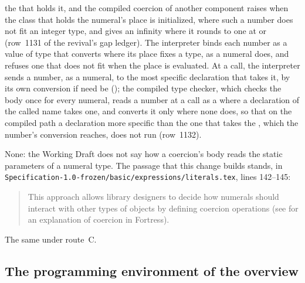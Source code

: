 \begin{description}
the  that holds it, and the compiled coercion of another
component raises  when the class that holds the numeral's
place is initialized, where such a number does not fit an integer type, and
gives an infinity where it rounds to one at  or
 (row~1131 of the revival's gap ledger).
The interpreter binds each number as a value of type  that
converts where its place fixes a type, as a numeral does, and refuses one that
does not fit when the place is evaluated.
At a call, the interpreter sends a number, as a numeral, to the most specific
declaration that takes it, by its own conversion if need be
(); the compiled type checker, which checks the body
once for every numeral, reads a number at a call as a  where a
declaration of the called name takes one, and converts it only where none does,
so that on the compiled path a declaration more specific than the one that takes
the , which the number's conversion reaches, does not run
(row~1132).
\item[Original text] None: the Working Draft does not say how a coercion's body
reads the static parameters of a numeral type.
The passage that this change builds stands, in
\nolinkurl{Specification-1.0-frozen/basic/expressions/literals.tex}, lines
142--145:
\begin{quote}
This approach allows library designers to decide how numerals should
interact with other types of objects by defining coercion operations
(see  for an explanation of coercion
in Fortress).
\end{quote}
\item[Route C] The same under route~C.
\end{description}

\subsection{The programming environment of the overview}

